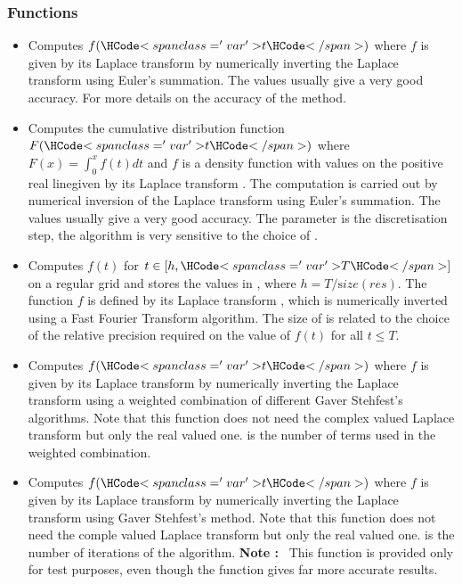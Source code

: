 \subsubsection{Functions}
\begin{itemize}
\item {}
  \sshortdescribe Computes $f(\var{t})$ where $f$ is given by its Laplace
  transform  by numerically inverting the Laplace transform using
  Euler's summation. The values  usually give a very good
  accuracy. For more details on the accuracy of the method. 

\item {}
  \sshortdescribe Computes the cumulative distribution function $F(\var{t})$
  where $F(x) = \int_0^x f(t) dt$ and $f$ is a density function with values on
  the positive real linegiven by its Laplace transform . The
  computation is carried out by numerical inversion of the Laplace transform
  using Euler's summation. The values  usually give a very
  good accuracy. The parameter  is the discretisation step, the
  algorithm is very sensitive to the choice of .

\item {}
  \sshortdescribe Computes $f(t)$ for $t \in [h, \var{T}]$ on a regular grid
  and stores the values in , where $h = T / {\mathrm size}(res)$. The
  function $f$ is defined by its Laplace transform , which is
  numerically inverted using a Fast Fourier Transform algorithm. The size of
   is related to the choice of the relative precision 
  required on the value of $f(t)$ for all $t \le T$.

\item {}
  \sshortdescribe Computes $f(\var{t})$ where $f$ is given by its Laplace
  transform  by numerically inverting the Laplace transform using a
  weighted combination of different Gaver Stehfest's algorithms. Note that
  this function does not need the complex valued Laplace transform but only the
  real valued one.  is the number of terms used in the weighted combination.

\item {}
  \sshortdescribe Computes $f(\var{t})$ where $f$ is given by its Laplace
  transform  by numerically inverting the Laplace transform using
  Gaver Stehfest's method. Note that this function does not
  need the comple valued Laplace transform but only the real valued
  one.  is the number of iterations of the algorithm.
  {\bf Note : }~This function is provided only for test purposes, even though
  the function  gives far more accurate results.
\end{itemize}

